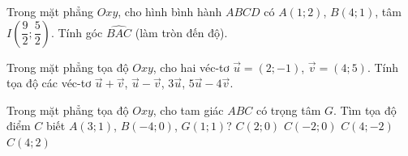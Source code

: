 \begin{bt}%
Trong mặt phẳng $Oxy$, cho hình bình hành $ABCD$ có $A(1;2)$, $B(4;1)$, tâm $I\left(\dfrac{9}{2};\dfrac{5}{2}\right)$. Tính góc $\widehat{BAC}$ (làm tròn đến độ).

\end{bt}

\begin{bt}%
	Trong mặt phẳng tọa độ $Oxy$, cho hai véc-tơ $\overrightarrow{u}=(2;-1)$, $\overrightarrow{v}=(4;5)$. Tính tọa độ các véc-tơ $\overrightarrow{u}+\overrightarrow{v}$, $\overrightarrow{u}-\overrightarrow{v}$, $3\overrightarrow{u}$, $5\overrightarrow{u}-4\overrightarrow{v}$.
\end{bt}

\begin{ex}%
	Trong mặt phẳng tọa độ $Oxy$, cho tam  giác $ABC$ có trọng tâm $G$. Tìm tọa độ điểm $C$ biết $A(3;1)$, $B(-4;0)$, $G(1;1)$?
	 \choice
		{$C(2;0)$} 
		 {$C(-2;0)$}
		 {$C(4;-2)$}
		{\True  $C(4;2)$}
\end{ex}

